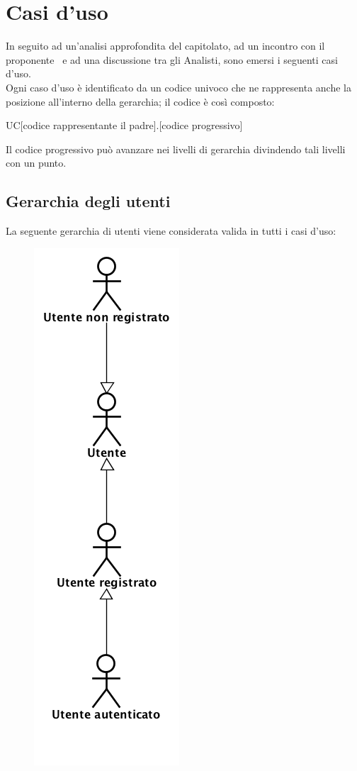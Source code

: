 \section{Casi d'uso}
In seguito ad un'analisi approfondita del capitolato, ad un incontro con il proponente \Zucchetti\ e ad una discussione tra gli Analisti, sono emersi i seguenti casi d'uso.\\
Ogni caso d'uso è identificato da un codice univoco che ne rappresenta anche la posizione all'interno della gerarchia; il codice è così composto:
\begin{center}
UC[codice rappresentante il padre].[codice progressivo]
\end{center}
Il codice progressivo può avanzare nei livelli di gerarchia divindendo tali livelli con un punto.
\newpage
\subsection{Gerarchia degli utenti}
La seguente gerarchia di utenti viene considerata valida in tutti i casi d'uso:
\begin{figure}[h]
\begin{center}
	 \includegraphics[scale=0.5]{diagram/gerarchia.png}
\end{center}
\end{figure}

